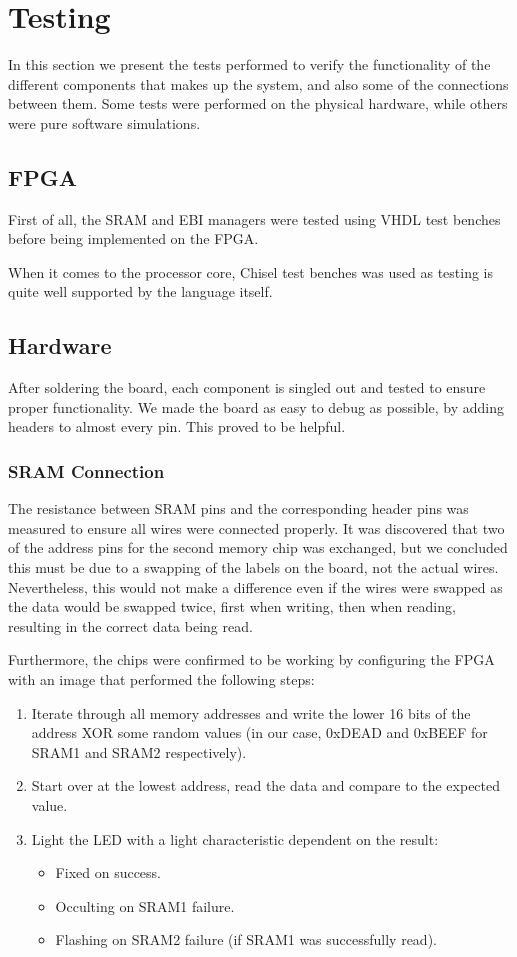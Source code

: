 \section{Testing}

In this section we present the tests performed to verify the functionality of the different components that makes up the system, and also some of the connections between them.
Some tests were performed on the physical hardware, while others were pure software simulations.

\subsection{FPGA}
First of all, the SRAM and EBI managers were tested using VHDL test benches before being implemented on the FPGA.

When it comes to the processor core, Chisel test benches was used as testing is quite well supported by the language itself.

\subsection{Hardware}
After soldering the board, each component is singled out and tested to ensure proper functionality.
We made the board as easy to debug as possible, by adding headers to almost every pin.
This proved to be helpful.

\subsubsection{SRAM Connection}
The resistance between SRAM pins and the corresponding header pins was measured to ensure all wires were connected properly.
It was discovered that two of the address pins for the second memory chip was exchanged, but we concluded this must be due to a swapping of the labels on the board, not the actual wires.
Nevertheless, this would not make a difference even if the wires were swapped as the data would be swapped twice, first when writing, then when reading, resulting in the correct data being read.

Furthermore, the chips were confirmed to be working by configuring the FPGA with an image that performed the following steps:
\begin{enumerate}
    \item Iterate through all memory addresses and write the lower 16 bits of the address XOR some random values (in our case, 0xDEAD and 0xBEEF for SRAM1 and SRAM2 respectively).
    \item Start over at the lowest address, read the data and compare to the expected value.
    \item Light the LED with a light characteristic dependent on the result:
        \begin{itemize}
            \item Fixed on success.
            \item Occulting on SRAM1 failure.
            \item Flashing on SRAM2 failure (if SRAM1 was successfully read).
        \end{itemize}
\end{enumerate}

